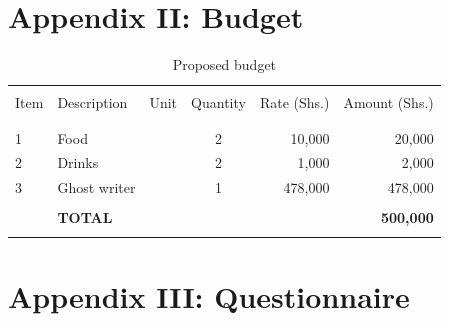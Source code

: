\cleardoublepage  %
\section*{Appendix II: Budget}
%

\begin{table}[!h]
	\begin{center}
		\caption{\label{tbl:Budget}Proposed budget}
		\begin{tabular}{llccrr}
			\hline \\
				Item & Description    & Unit      & Quantity  & Rate (Shs.) & Amount (Shs.)    \\
			\\
			\hline \\				
				1    & Food           &           & 2         & 10,000      & 20,000           \\
				2    & Drinks         &           & 2         & 1,000       & 2,000            \\
				3    & Ghost writer   &           & 1         & 478,000     & 478,000          \\
			\\
				& \textbf{TOTAL} & \textbf{} & \textbf{} & \textbf{}   & \textbf{500,000}		\\
			\hline \\ 
		\end{tabular}
	\end{center}
\end{table}

\cleardoublepage  %
\section*{Appendix III: Questionnaire}
%

